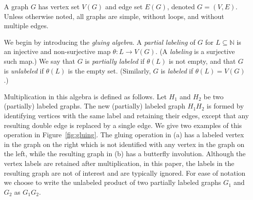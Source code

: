\documentclass{article}
\theoremstyle{definition}
\begin{document}
A graph $G$ has vertex set $V(G)$ and edge set $E(G)$, denoted $G = (V,E)$. Unless otherwise noted, all graphs are simple, without loops, and without multiple edges.

We begin by introducing the \textit{gluing algebra}. A \textit{partial labeling} of $G$ for $L \subseteq \mathbb{N}$ is an injective and non-surjective map $\theta: L \to V(G)$. (A \textit{labeling} is a surjective such map.)  We say that $G$ is \textit{partially labeled} if $\theta(L)$ is not empty, and that $G$ is \textit{unlabeled} if $\theta(L)$ is the empty set. (Similarly, $G$ is \textit{labeled} if $\theta(L)=V(G)$.)

Multiplication in this algebra is defined as follows. Let $H_1$ and $H_2$ be two (partially) labeled graphs. The new (partially) labeled graph $H_1 H_2$ is formed by identifying vertices with the same label and retaining their edges, except that any resulting double edge is replaced by a single edge. We give two examples of this operation in Figure~\ref{fig:gluing}. The gluing operation in (a) has a labeled vertex in the graph on the right which is not identified with any vertex in the graph on the left, while the resulting graph in (b) has a butterfly involution. Although the vertex labels are retained after multiplication, in this paper, the labels in the resulting graph are not of interest and are typically ignored. For ease of notation we choose to write the unlabeled product of two partially labeled graphs $G_1$ and $G_2$ as $G_1G_2$. 
\end{document}
